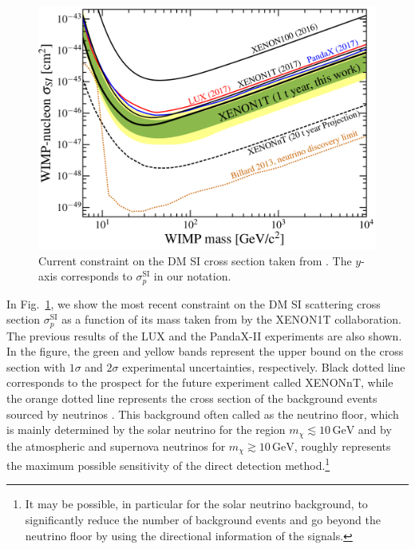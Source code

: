 \documentclass[12pt,twoside,book]{article}
\begin{document}
\begin{figure}[t]
  \centering
  \includegraphics[width=0.5\hsize]{x1t_prelim_limits.pdf}
  \caption{
    Current constraint on the DM SI cross section taken from \cite{Aprile:2018dbl}.
    The $y$-axis corresponds to $\sigma_p^{\mathrm{SI}}$ in our notation.
  }
  \label{fig:XENON1T}
\end{figure}

In Fig.~\ref{fig:XENON1T}, we show the most recent constraint on the DM SI scattering cross section $\sigma_p^{\mathrm{SI}}$ as a function of its mass taken from \cite{Aprile:2018dbl} by the XENON1T collaboration.
The previous results of the LUX \cite{Akerib:2016vxi} and the PandaX-II \cite{Cui:2017nnn} experiments are also shown.
In the figure, the green and yellow bands represent the upper bound on the cross section with $1\sigma$ and $2\sigma$ experimental uncertainties, respectively.
Black dotted line corresponds to the prospect for the future experiment called XENONnT, while the orange dotted line represents the cross section of the background events sourced by neutrinos \cite{Billard:2013qya}.
This background often called as the neutrino floor, which is mainly determined by the solar neutrino for the region $m_\chi \lesssim 10\,\mathrm{GeV}$ and by the atmospheric and supernova neutrinos for $m_\chi \gtrsim 10\,\mathrm{GeV}$, roughly represents the maximum possible sensitivity of the direct detection method.\footnote{
  It may be possible, in particular for the solar neutrino background, to significantly reduce the number of background events and go beyond the neutrino floor by using the directional information of the signals.
}
\end{document}
